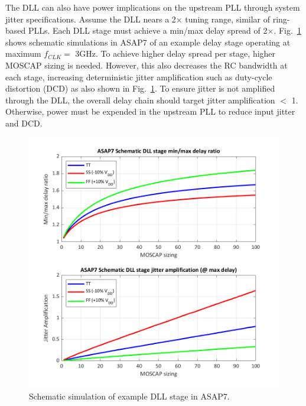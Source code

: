 \documentclass[twoside,9pt,journal,letterpage]{IEEEtran}
\begin{document}
The DLL can also have power implications on the upstream PLL through system jitter specifications. Assume the DLL nears a 2$\times$ tuning range, similar of ring-based PLLs. Each DLL stage must achieve a min/max delay spread of 2$\times$. Fig.\ \ref{fig:dllasap7} shows schematic simulations in ASAP7 of an example delay stage operating at maximum $f_{CLK}=$ 3GHz. To achieve higher delay spread per stage, higher MOSCAP sizing is needed. However, this also decreases the RC bandwidth at each stage, increasing deterministic jitter amplification such as duty-cycle distortion (DCD) as also shown in Fig.\ \ref{fig:dllasap7}. To ensure jitter is not amplified through the DLL, the overall delay chain should target jitter amplification $<$ 1. Otherwise, power must be expended in the upstream PLL to reduce input jitter and DCD.
\vspace{-10pt}
\begin{figure}[h]
	\centering
	\includegraphics[width=0.8\columnwidth]{fig_dllasap7}
	\caption{Schematic simulation of example DLL stage in ASAP7.}
	\label{fig:dllasap7}
\end{figure}
\vspace{-15pt}
\end{document}
